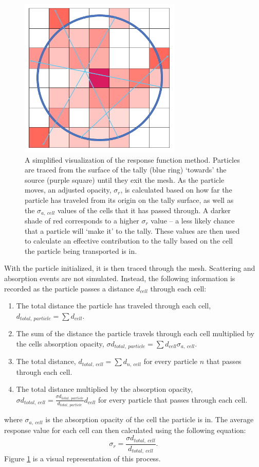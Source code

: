 \begin{figure} [h!]
	\centering
	\includegraphics[height=3in]{VarReduction/plots/resp_funct_pt_src_vis.png}
	\caption{A simplified visualization of the response function method. Particles are traced from the surface of the tally (blue ring) ‘towards’ the source (purple square) until they exit the mesh. As the particle moves, an adjusted opacity, $\sigma_{r}$, is calculated based on how far the particle has traveled from its origin on the tally surface, as well as the $\sigma_{a,~cell}$ values of the cells that it has passed through. A darker shade of red corresponds to a higher $\sigma_{r}$ value – a less likely chance that a particle will ‘make it’ to the tally. These values are then used to calculate an effective contribution to the tally based on the cell the particle being transported is in.}
	\label{fig:resp_funct_visual}
\end{figure}

With the particle initialized, it is then traced through the mesh. Scattering and absorption events are not simulated. Instead, the following information is recorded as the particle passes a distance $d_{cell}$ through each cell:
\begin{enumerate}
	\item The total distance the particle has traveled through each cell, $d_{total,~particle} = \sum d_{cell}$.
	\item The sum of the distance the particle travels through each cell multiplied by the cells absorption opacity, $\sigma d_{total,~particle} = \sum d_{cell} \sigma_{a,~cell}$.
	\item The total distance, $d_{total,~cell} = \sum d_{n,~cell}$ for every particle $n$ that passes through each cell.
	\item The total distance multiplied by the absorption opacity, $\sigma d_{total,~cell} = \frac{\sigma d_{total,~particle}}{d_{total,~particle}} d_{cell}$ for every particle that passes through each cell.
\end{enumerate}
where $\sigma_{a,~cell}$ is the absorption opacity of the cell the particle is in. The average response value for each cell can then calculated using the following equation:
\begin{equation}
\sigma_{r} = \frac{\sigma d_{total,~cell}}{d_{total,~cell}}.
\end{equation}
Figure \ref{fig:resp_funct_visual} is a visual representation of this process. 


